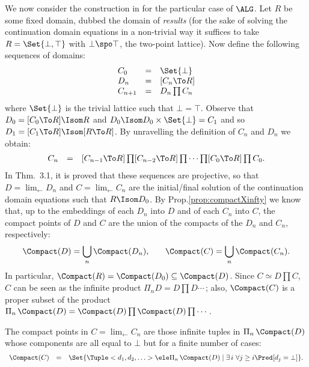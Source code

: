 \documentclass{CSML}
\begin{document}
We now consider the construction in \cite{Streicher-Reus'98} for the particular case of $\ALG$. Let $R$ be some fixed domain, dubbed the domain of \emph{results} (for the sake of solving the continuation domain equations in a non-trivial way it suffices to take $R = \Set{\bot,\top}$ with $\bot \spo \top $, the two-point lattice). Now define the following sequences of domains:
%
 \[ \begin{array}{lll}
C_0 &=& \Set{\bot} \\
D_n &=& [C_n \To R] \\
C_{n+1} &=& D_n\prod C_n 
 \end{array} \]
where $ \Set{\bot}$ is the trivial lattice such that $\bot = \top$. 
Observe that $D_0 = [C_0\To R] \Isom R $ and $ D_0 \Isom D_0 \times \Set{\bot} = C_1$ and so $D_1= [C_1 \To R] \Isom [R \To R]$. By unravelling the definition of $C_n$ and $D_n$ we obtain:
%
 \[ \begin{array}{rcl}
C_n	&=& 
[C_{n-1} \To R]\prod [C_{n-2} \To R]\prod \cdots\prod [C_0\To R]\prod C_0.
 \end{array} \]
In \cite{Streicher-Reus'98} Thm.~3.1, it is proved that these sequences are projective, so that $D = \lim_{\leftarrow} D_n$ and $C = \lim_{\leftarrow} C_n$ are the initial/final solution of the continuation domain equations such that $R \Isom D_0$.
By Prop.\skp\ref{prop:compactXinfty} we know that, up to the embeddings of each $D_n$ into $D$ and of each $C_n$ into $C$, the compact points of $D$ and $C$ are the union of the compacts of the $D_n$ and $C_n$, respectively:
 \begin{eqnarray} \label{eq:compactUnion}
 \Compact(D) = \bigcup_n \Compact(D_n), &\quad& \Compact(C) = \bigcup_n \Compact(C_n).
 \end{eqnarray}
In particular, $\Compact(R) = \Compact(D_0) \subseteq \Compact(D)$.
Since $C \simeq D\prod C$, $C$ can be seen as the infinite product $\Pi_n D = D\prod D \cdots \,$; also, $\Compact(C)$ is a proper subset of the product $\Pi_n \, \Compact(D) = \Compact(D)\prod \Compact(D)\prod \cdots$. 

 \begin{prop} \label{prop:compcats_of_C}
The compact points in $C = \lim_{\leftarrow} C_n$ are those infinite tuples in $\Pi_n \, \Compact(D)$ whose components are all equal to $\bot$ but for a finite number of cases:
%
 \[ \begin{array}{rcl}
\Compact(C) &=& \Set{\Tuple <d_1, d_2, \ldots > \ele \Pi_n \, \Compact(D) \mid \exists \,i \ \forall j\geq i \Pred[ d_j = \bot] }.
 \end{array} \]
 \end{prop}
\end{document}
